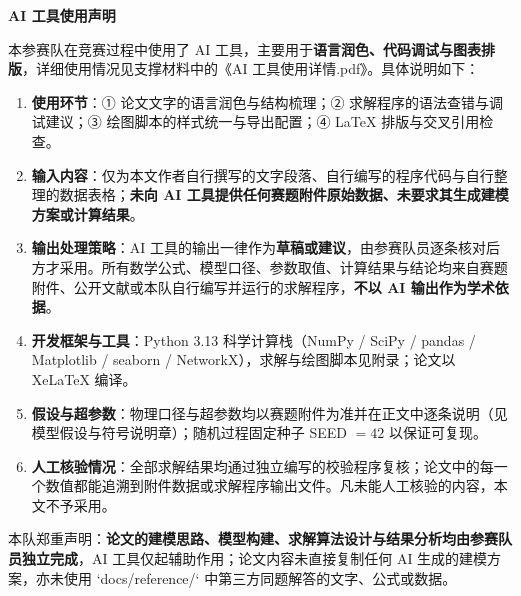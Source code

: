 \newpage
{}
{}
\begin{center}
	{\bfseries AI 工具使用声明}
\end{center}

本参赛队在竞赛过程中使用了 AI 工具，主要用于\textbf{语言润色、代码调试与图表排版}，详细使用情况见支撑材料中的《AI 工具使用详情.pdf》。具体说明如下：

\begin{enumerate}[label=\arabic*.]
	\item \textbf{使用环节}：① 论文文字的语言润色与结构梳理；② 求解程序的语法查错与调试建议；③ 绘图脚本的样式统一与导出配置；④ LaTeX 排版与交叉引用检查。
	\item \textbf{输入内容}：仅为本文作者自行撰写的文字段落、自行编写的程序代码与自行整理的数据表格；\textbf{未向 AI 工具提供任何赛题附件原始数据、未要求其生成建模方案或计算结果}。
	\item \textbf{输出处理策略}：AI 工具的输出一律作为\textbf{草稿或建议}，由参赛队员逐条核对后方才采用。所有数学公式、模型口径、参数取值、计算结果与结论均来自赛题附件、公开文献或本队自行编写并运行的求解程序，\textbf{不以 AI 输出作为学术依据}。
	\item \textbf{开发框架与工具}：Python 3.13 科学计算栈（NumPy / SciPy / pandas / Matplotlib / seaborn / NetworkX），求解与绘图脚本见附录；论文以 XeLaTeX 编译。
	\item \textbf{假设与超参数}：物理口径与超参数均以赛题附件为准并在正文中逐条说明（见模型假设与符号说明章）；随机过程固定种子 SEED $=42$ 以保证可复现。
	\item \textbf{人工核验情况}：全部求解结果均通过独立编写的校验程序复核；论文中的每一个数值都能追溯到附件数据或求解程序输出文件。凡未能人工核验的内容，本文不予采用。
\end{enumerate}

本队郑重声明：\textbf{论文的建模思路、模型构建、求解算法设计与结果分析均由参赛队员独立完成}，AI 工具仅起辅助作用；论文内容未直接复制任何 AI 生成的建模方案，亦未使用 `docs/reference/` 中第三方同题解答的文字、公式或数据。
